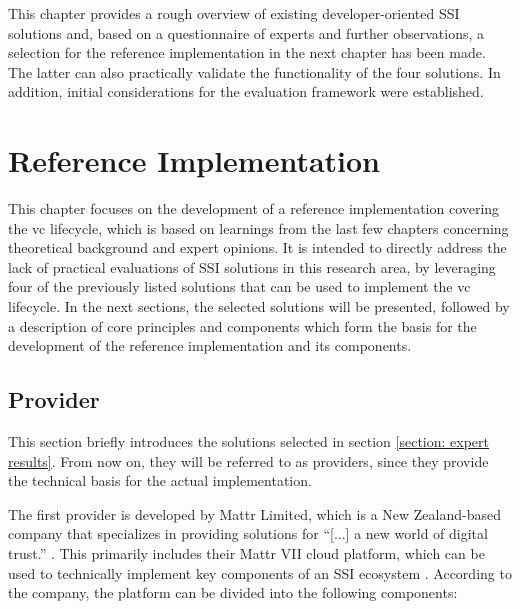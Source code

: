    This chapter provides a rough overview of existing developer-oriented \ac{SSI} solutions and, based on a questionnaire of experts and further observations, a selection for the reference implementation in the next chapter has been made. The latter can also practically validate the functionality of the four solutions. In addition, initial considerations for the evaluation framework were established.

\chapter{Reference Implementation}\label{chapter: ref implementation}

This chapter focuses on the development of a reference implementation covering the \ac{vc} lifecycle, which is based on learnings from the last few chapters concerning theoretical background and expert opinions. It is intended to directly address the lack of practical evaluations of \ac{SSI} solutions in this research area, by leveraging four of the previously listed solutions that can be used to implement the \ac{vc} lifecycle. In the next sections, the selected solutions will be presented, followed by a description of core principles and components which form the basis for the development of the reference implementation and its components.

    \section{Provider}
    
    This section briefly introduces the solutions selected in section \ref{section: expert results}. From now on, they will be referred to as providers, since they provide the technical basis for the actual implementation.
    
    The first provider is developed by Mattr Limited, which is a New Zealand-based company \cite{Mattr_privacy_2021} that specializes in providing solutions for “[...] a new world of digital trust.” \cite{Mattr_Mattr_2021-4}. This primarily includes their Mattr VII cloud platform, which can be used to technically implement key components of an \ac{SSI} ecosystem \cite{Mattr_products_2021}. According to the company, the platform can be divided into the following components: \cite{Mattr_Mattr_2021-2}


